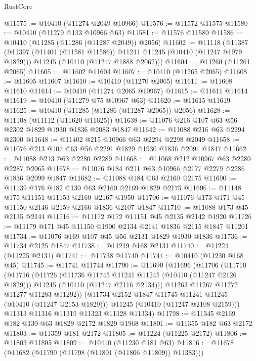 \begin{lexlean}{RustCore}
\begin{coremodule}
@11575 := @10410 (@11274 @2049 @10966)
@11576 := @11572 @11575
@11580 := @10410 (@11279 @133 @10966 @63)
@11581 := @11576 @11580
@11586 := @10410 (@11285 (@11286 (@11287 @2049)) @2056)
@11602 := @11118
    (@11387
      (@11397 (@11401 (@11581 @11586)) @11241 @11245 (@10410 (@11247 @1979 @1829)))
      @11245
      (@10410 (@11247 @1888 @2062)))
@11604 := @11260 (@11261 @2065)
@11605 := @11602 @11604
@11607 := @10410 (@11265 @2065)
@11608 := @11605 @11607
@11610 := @10410 (@11270 @2065)
@11611 := @11608 @11610
@11614 := @10410 (@11274 @2065 @10967)
@11615 := @11611 @11614
@11619 := @10410 (@11279 @75 @10967 @63)
@11620 := @11615 @11619
@11625 := @10410 (@11285 (@11286 (@11287 @2065)) @2056)
@11628 := @11108 (@11112 (@11620 @11625))
@11638 := @11076 @216 @107 @63 @56 @2302 @1829 @1930 @1836 @2083 @1847
@11642 := @11088 @216 @63 @2294 @2300
@11648 := @11402 @215 @10966 @63 @2294 @2298 @2049
@11658 := @11076 @213 @107 @63 @56 @2291 @1829 @1930 @1836 @2091 @1847
@11662 := @11088 @213 @63 @2280 @2289
@11668 := @11068 @212 @10967 @63 @2280 @2287 @2065
@11678 := @11076 @184 @211 @63 @10966 @2177 @2279 @2286 @1836 @2099 @1847
@11682 := @11088 @184 @63 @2160 @2175
@11690 := @11139 @176 @182 @130 @63 @2160 @2169 @1829 @2175
@11696 := @11148 @175 @11151 @11153 @2160 @2167 @1950
@11706 := @11076 @173 @171 @45 @11150 @2146 @2159 @2166 @1836 @2107 @1847
@11710 := @11088 @173 @45 @2135 @2144
@11716 := @11172 @172 @11151 @45 @2135 @2142 @1920
@11726 := @11179 @171 @45 @11150 @1900 @2134 @2141 @1836 @2115 @1847 @11201
@11734 := @11076 @169 @107 @45 @56 @2131 @1829 @1930 @1836
@11736 := @11734 @2125 @1847
@11738 := @11219 @168 @2131
@11740 := @11224 (@11225 @2131)
@11741 := @11738 @11740
@11744 := @10410 (@11230 @168 @45)
@11745 := @11741 @11744
@11790 := @11690
    (@11696
      (@11706
        (@11710
          (@11716
            (@11726
              (@11736 @11745 @11241 @11245 (@10410 (@11247 @2126 @1829)))
              @11245
              (@10410 (@11247 @2116 @2134)))
            @11263
            @11267
            @11272
            @11277
            @11283
            @11292))
        (@11734 @2152 @1847 @11745 @11241 @11245 (@10410 (@11247 @2153 @1829)))
        @11245
        (@10410 (@11247 @2108 @2159)))
      @11313
      @11316
      @11319
      @11323
      @11328
      @11334)
@11798 := @11345 @2169 @182 @130 @63 @1829 @2172 @1829 @1968
@11801 := @11355 @182 @63 @2172
@11803 := @11359 @181 @2172
@11805 := @11224 (@11225 @2172)
@11806 := @11803 @11805
@11809 := @10410 (@11230 @181 @63)
@11816 := @11678 (@11682 (@11790 (@11798 (@11801 (@11806 @11809)) @11383)))

\end{coremodule}
\end{lexlean}
